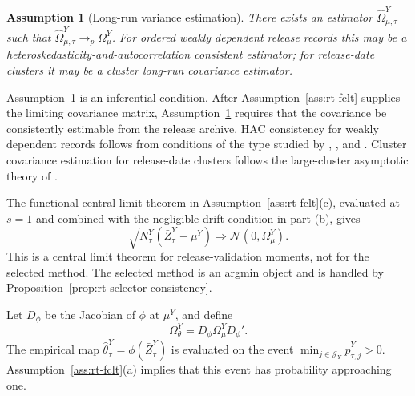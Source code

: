 \documentclass[a4paper, 12pt]{article}
\theoremstyle{plain}
\newtheorem{assumption}{Assumption}
\theoremstyle{remark}
\newcommand{\1}{\mathbf{1}}
\begin{document}
\begin{assumption}[Long-run variance estimation]
\label{ass:rt-lrv}
There exists an estimator \(\widehat\Omega^Y_{\mu,\tau}\) such that \(\widehat\Omega^Y_{\mu,\tau}\to_p\Omega^Y_\mu\). For ordered weakly dependent release records this may be a heteroskedasticity-and-autocorrelation consistent estimator; for release-date clusters it may be a cluster long-run covariance estimator.
\end{assumption}

Assumption~\ref{ass:rt-lrv} is an inferential condition. After Assumption~\ref{ass:rt-fclt} supplies the limiting covariance matrix, Assumption~\ref{ass:rt-lrv} requires that the covariance be consistently estimable from the release archive. HAC consistency for weakly dependent records follows from conditions of the type studied by \citet{NeweyWest1987}, \citet{Andrews1991}, and \citet{deJongDavidson2000Econometrica}. Cluster covariance estimation for release-date clusters follows the large-cluster asymptotic theory of \citet{HansenLee2019}.

The functional central limit theorem in Assumption~\ref{ass:rt-fclt}(c), evaluated at \(s=1\) and combined with the negligible-drift condition in part (b), gives
\begin{equation}
\label{eq:rt-sample-moment-clt}
    \sqrt{N^Y_\tau}\left(\bar Z^Y_\tau-\mu^Y\right)
    \Rightarrow
    \mathcal N(0,\Omega^Y_\mu).
\end{equation}
This is a central limit theorem for release-validation moments, not for the selected method. The selected method is an argmin object and is handled by Proposition~\ref{prop:rt-selector-consistency}.

Let \(D_\phi\) be the Jacobian of \(\phi\) at \(\mu^Y\), and define
\begin{equation*}
    \Omega^Y_\theta=D_\phi\Omega^Y_\mu D_\phi' .
\end{equation*}
The empirical map \(\widehat\theta^Y_\tau=\phi(\bar Z^Y_\tau)\) is evaluated on the event \(\min_{j\in\mathcal J_Y}\widehat p^Y_{\tau,j}>0\). Assumption~\ref{ass:rt-fclt}(a) implies that this event has probability approaching one.
\end{document}
